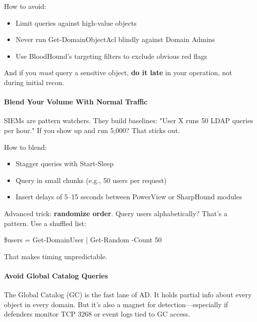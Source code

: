 How to avoid:

\begin{itemize}
    \item Limit queries against high-value objects

    \item Never run Get-DomainObjectAcl blindly against Domain Admins

    \item Use BloodHound’s targeting filters to exclude obvious red flags

\end{itemize}
And if you \textit{must} query a sensitive object, \textbf{do it late} in your operation, not during initial recon.

\paragraph{\textbf{   Blend Your Volume With Normal Traffic}}

SIEMs are pattern watchers. They build baselines: "User X runs 50 LDAP queries per hour." If you show up and run 5,000? That sticks out.

How to blend:

\begin{itemize}
    \item Stagger queries with Start-Sleep

    \item Query in small chunks (e.g., 50 users per request)

    \item Insert delays of 5–15 seconds between PowerView or SharpHound modules

\end{itemize}
Advanced trick: \textbf{randomize order}. Query users alphabetically? That’s a pattern. Use a shuffled list:

\$users = Get-DomainUser | Get-Random -Count 50

That makes timing unpredictable.

\paragraph{\textbf{   Avoid Global Catalog Queries}}

The Global Catalog (GC) is the fast lane of AD. It holds partial info about every object in every domain. But it’s also a magnet for detection—especially if defenders monitor TCP 3268 or event logs tied to GC access.


